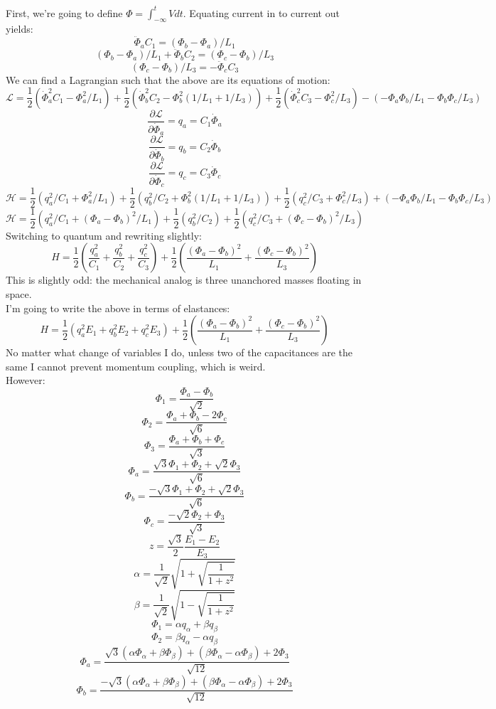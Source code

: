 \documentclass[final]{article}
\begin{document}
First, we're going to define \(\Phi=\int_{-\infty}^t V dt\). Equating current in to current out yields:
\[\ddot \Phi_a C_1=(\Phi_b-\Phi_a)/L_1\]
\[(\Phi_b-\Phi_a)/L_1+\ddot \Phi_b C_2=(\Phi_c-\Phi_b)/L_3\]
\[(\Phi_c-\Phi_b)/L_3=-\ddot \Phi_c C_3\]
We can find a Lagrangian such that the above are its equations of motion:
\[\mathcal L=\frac{1}{2}\left(\dot \Phi_a^2 C_1- \Phi_a^2/L_1\right)+\frac{1}{2}\left(\dot \Phi_b^2C_2- \Phi_b^2(1/L_1+1/L_3)\right)+
\frac{1}{2}\left(\dot \Phi_c^2 C_3- \Phi_c^2/L_3\right)-\left(-\Phi_a \Phi_b/L_1-\Phi_b \Phi_c/L_3\right)\]
\[\frac{\partial \mathcal L}{\partial \dot \Phi_a}=q_a=C_1 \dot \Phi_a\]
\[\frac{\partial \mathcal L}{\partial \dot \Phi_b}=q_b=C_2 \dot \Phi_b\]
\[\frac{\partial \mathcal L}{\partial \dot \Phi_c}=q_c=C_3 \dot \Phi_c\]
\[\mathcal H=\frac{1}{2}\left(q_a^2/C_1+ \Phi_a^2/L_1\right)+\frac{1}{2}\left(q_b^2/C_2+ \Phi_b^2(1/L_1+1/L_3)\right)+
\frac{1}{2}\left(q_c^2/C_3+ \Phi_c^2/L_3\right)+\left(-\Phi_a \Phi_b/L_1-\Phi_b \Phi_c/L_3\right)\]
\[\mathcal H=\frac{1}{2}\left(q_a^2/C_1+ (\Phi_a-\Phi_b)^2/L_1\right)+\frac{1}{2}\left(q_b^2/C_2\right)+
\frac{1}{2}\left(q_c^2/C_3+ (\Phi_c-\Phi_b)^2/L_3\right)\]
Switching to quantum and rewriting slightly:
\[H=\frac{1}{2}\left(\frac{q_a^2}{C_1}+\frac{q_b^2}{C_2}+\frac{q_c^2}{C_3}\right)+
\frac{1}{2}\left(\frac{(\Phi_a-\Phi_b)^2}{L_1}+\frac{(\Phi_c-\Phi_b)^2}{L_3}\right)\]
This is slightly odd: the mechanical analog is three unanchored masses floating in space.\\
I'm going to write the above in terms of elastances:
\[H=\frac{1}{2}\left(q_a^2 E_1+q_b^2E_2+q_c^2E_3\right)+
\frac{1}{2}\left(\frac{(\Phi_a-\Phi_b)^2}{L_1}+\frac{(\Phi_c-\Phi_b)^2}{L_3}\right)\]
No matter what change of variables I do, unless two of the capacitances are the same I cannot prevent momentum coupling, which is weird.\\
However:
\[\Phi_1=\frac{\Phi_a-\Phi_b}{\sqrt{2}}\]
\[\Phi_2=\frac{\Phi_a+\Phi_b-2\Phi_c}{\sqrt{6}}\]
\[\Phi_3=\frac{\Phi_a+\Phi_b+\Phi_c}{\sqrt{3}}\]
\[\Phi_a=\frac{\sqrt{3}\Phi_1+\Phi_2+\sqrt{2}\Phi_3}{\sqrt{6}}\]
\[\Phi_b=\frac{-\sqrt{3}\Phi_1+\Phi_2+\sqrt{2}\Phi_3}{\sqrt{6}}\]
\[\Phi_c=\frac{-\sqrt{2}\Phi_2+\Phi_3}{\sqrt{3}}\]
\[z=\frac{\sqrt{3}}{2} \frac{E_1-E_2}{E_3}\]
\[\alpha=\frac{1}{\sqrt{2}} \sqrt{1+\sqrt{\frac{1}{1+z^2}}}\]
\[\beta=\frac{1}{\sqrt{2}} \sqrt{1-\sqrt{\frac{1}{1+z^2}}}\]
\[\Phi_1=\alpha q_\alpha+\beta q_\beta\]
\[\Phi_2=\beta q_\alpha-\alpha q_\beta\]
\[\Phi_a=\frac{\sqrt{3}(\alpha \Phi_\alpha+\beta \Phi_\beta)+(\beta \Phi_\alpha-\alpha \Phi_\beta)+2\Phi_3}{\sqrt{12}}\]
\[\Phi_b=\frac{-\sqrt{3}(\alpha \Phi_\alpha+\beta \Phi_\beta)+(\beta \Phi_\alpha-\alpha \Phi_\beta)+2\Phi_3}{\sqrt{12}}\]
\end{document}
